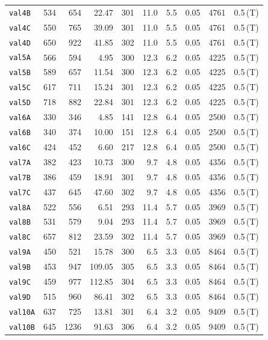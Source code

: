 \begin{longtable}{lrrrrrrrrl}
\texttt{val4B} & 534 & 654 & 22.47 & 301 & 11.0 & 5.5 & 0.05 & 4761 & 0.5\,(T) \\
\texttt{val4C} & 550 & 765 & 39.09 & 301 & 11.0 & 5.5 & 0.05 & 4761 & 0.5\,(T) \\
\texttt{val4D} & 650 & 922 & 41.85 & 302 & 11.0 & 5.5 & 0.05 & 4761 & 0.5\,(T) \\
\texttt{val5A} & 566 & 594 & 4.95 & 300 & 12.3 & 6.2 & 0.05 & 4225 & 0.5\,(T) \\
\texttt{val5B} & 589 & 657 & 11.54 & 300 & 12.3 & 6.2 & 0.05 & 4225 & 0.5\,(T) \\
\texttt{val5C} & 617 & 711 & 15.24 & 301 & 12.3 & 6.2 & 0.05 & 4225 & 0.5\,(T) \\
\texttt{val5D} & 718 & 882 & 22.84 & 301 & 12.3 & 6.2 & 0.05 & 4225 & 0.5\,(T) \\
\texttt{val6A} & 330 & 346 & 4.85 & 141 & 12.8 & 6.4 & 0.05 & 2500 & 0.5\,(T) \\
\texttt{val6B} & 340 & 374 & 10.00 & 151 & 12.8 & 6.4 & 0.05 & 2500 & 0.5\,(T) \\
\texttt{val6C} & 424 & 452 & 6.60 & 217 & 12.8 & 6.4 & 0.05 & 2500 & 0.5\,(T) \\
\texttt{val7A} & 382 & 423 & 10.73 & 300 & 9.7 & 4.8 & 0.05 & 4356 & 0.5\,(T) \\
\texttt{val7B} & 386 & 459 & 18.91 & 301 & 9.7 & 4.8 & 0.05 & 4356 & 0.5\,(T) \\
\texttt{val7C} & 437 & 645 & 47.60 & 302 & 9.7 & 4.8 & 0.05 & 4356 & 0.5\,(T) \\
\texttt{val8A} & 522 & 556 & 6.51 & 293 & 11.4 & 5.7 & 0.05 & 3969 & 0.5\,(T) \\
\texttt{val8B} & 531 & 579 & 9.04 & 293 & 11.4 & 5.7 & 0.05 & 3969 & 0.5\,(T) \\
\texttt{val8C} & 657 & 812 & 23.59 & 302 & 11.4 & 5.7 & 0.05 & 3969 & 0.5\,(T) \\
\texttt{val9A} & 450 & 521 & 15.78 & 300 & 6.5 & 3.3 & 0.05 & 8464 & 0.5\,(T) \\
\texttt{val9B} & 453 & 947 & 109.05 & 305 & 6.5 & 3.3 & 0.05 & 8464 & 0.5\,(T) \\
\texttt{val9C} & 459 & 977 & 112.85 & 304 & 6.5 & 3.3 & 0.05 & 8464 & 0.5\,(T) \\
\texttt{val9D} & 515 & 960 & 86.41 & 302 & 6.5 & 3.3 & 0.05 & 8464 & 0.5\,(T) \\
\texttt{val10A} & 637 & 725 & 13.81 & 301 & 6.4 & 3.2 & 0.05 & 9409 & 0.5\,(T) \\
\texttt{val10B} & 645 & 1236 & 91.63 & 306 & 6.4 & 3.2 & 0.05 & 9409 & 0.5\,(T) \\

\end{longtable}
